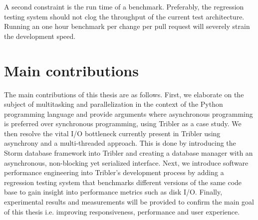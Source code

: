 A second constraint is the run time of a benchmark.
Preferably, the regression testing system should not clog the throughput of the current test architecture.
Running an one hour benchmark per change per pull request will severely strain the development speed.

\section{Main contributions}
The main contributions of this thesis are as follows.
First, we elaborate on the subject of multitasking and parallelization in the context of the Python programming language and provide arguments where asynchronous programming is preferred over synchronous programming, using Tribler as a case study.
We then resolve the vital I/O bottleneck currently present in Tribler using asynchrony and a multi-threaded approach.
This is done by introducing the Storm database framework into Tribler and creating a database manager with an asynchronous, non-blocking yet serialized interface.
Next, we introduce software performance engineering into Tribler's development process by adding a regression testing system that benchmarks different versions of the same code base to gain insight into performance metrics such as disk I/O.
Finally, experimental results and measurements will be provided to confirm the main goal of this thesis i.e. improving responsiveness, performance and user experience.
